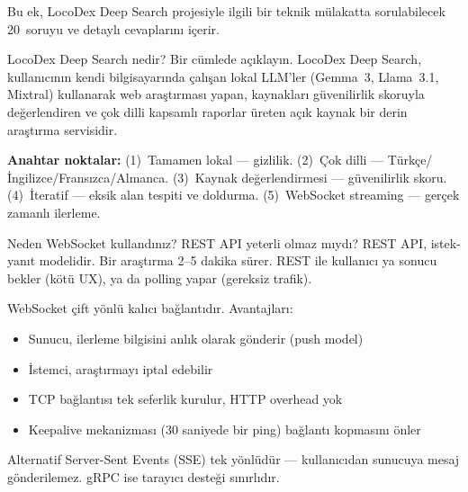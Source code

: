 
Bu ek, LocoDex Deep Search projesiyle ilgili bir teknik m\"{u}lakatta sorulabilecek 20~soruyu ve detayl{\i} cevaplar{\i}n{\i} i\c{c}erir.

\begin{mulakat}{LocoDex Deep Search nedir? Bir c\"{u}mlede a\c{c}{\i}klay{\i}n.}
LocoDex Deep Search, kullan{\i}c{\i}n{\i}n kendi bilgisayar{\i}nda \c{c}al{\i}\c{s}an lokal LLM'ler (Gemma~3, Llama~3.1, Mixtral) kullanarak web ara\c{s}t{\i}rmas{\i} yapan, kaynaklar{\i} g\"{u}venilirlik skoruyla de\u{g}erlendiren ve \c{c}ok dilli kapsaml{\i} raporlar \"{u}reten a\c{c}{\i}k kaynak bir derin ara\c{s}t{\i}rma servisidir.

\textbf{Anahtar noktalar:} (1)~Tamamen lokal --- gizlilik. (2)~\c{C}ok dilli --- T\"{u}rk\c{c}e/\.{I}ngilizce/Frans{\i}zca/Almanca. (3)~Kaynak de\u{g}erlendirmesi --- g\"{u}venilirlik skoru. (4)~\.{I}teratif --- eksik alan tespiti ve doldurma. (5)~WebSocket streaming --- ger\c{c}ek zamanl{\i} ilerleme.
\end{mulakat}

\begin{mulakat}{Neden WebSocket kulland{\i}n{\i}z? REST API yeterli olmaz m{\i}yd{\i}?}
REST API, istek-yan{\i}t modelidir. Bir ara\c{s}t{\i}rma 2--5 dakika s\"{u}rer. REST ile kullan{\i}c{\i} ya sonucu bekler (k\"{o}t\"{u} UX), ya da polling yapar (gereksiz trafik).

WebSocket \c{c}ift y\"{o}nl\"{u} kal{\i}c{\i} ba\u{g}lant{\i}d{\i}r. Avantajlar{\i}:
\begin{itemize}
  \item Sunucu, ilerleme bilgisini anl{\i}k olarak g\"{o}nderir (push model)
  \item \.{I}stemci, ara\c{s}t{\i}rmay{\i} iptal edebilir
  \item TCP ba\u{g}lant{\i}s{\i} tek seferlik kurulur, HTTP overhead yok
  \item Keepalive mekanizmas{\i} (30 saniyede bir ping) ba\u{g}lant{\i} kopmas{\i}n{\i} \"{o}nler
\end{itemize}

Alternatif Server-Sent Events (SSE) tek y\"{o}nl\"{u}d\"{u}r --- kullan{\i}c{\i}dan sunucuya mesaj g\"{o}nderilemez. gRPC ise taray{\i}c{\i} deste\u{g}i s{\i}n{\i}rl{\i}d{\i}r.
\end{mulakat}

